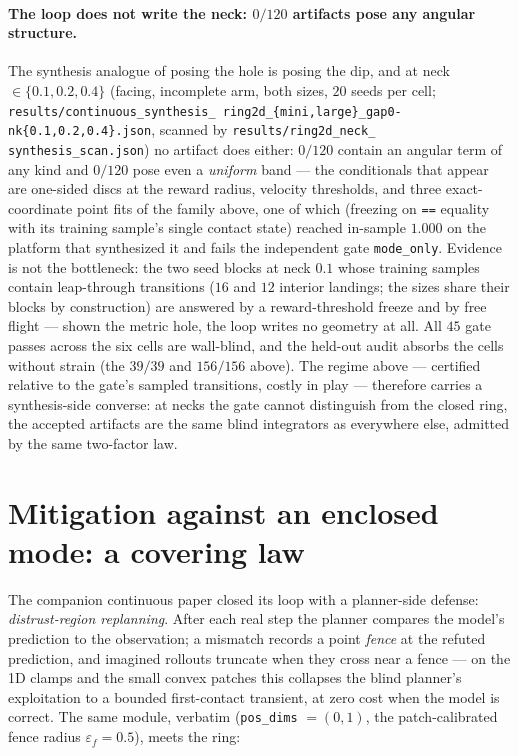\documentclass[11pt]{article}
\theoremstyle{remark}
\begin{document}
\paragraph{The loop does not write the neck: $0/120$ artifacts pose any
angular structure.} The synthesis analogue of posing the hole is posing
the dip, and at neck $\in \{0.1, 0.2, 0.4\}$ (facing, incomplete arm,
both sizes, $20$ seeds per cell;
\texttt{results/continuous\_\allowbreak synthesis\_\allowbreak
ring2d\_\allowbreak \{mini,large\}\_\allowbreak gap0-nk\{0.1,0.2,0.4\}.json},
scanned by \texttt{results/ring2d\_\allowbreak neck\_\allowbreak
synthesis\_\allowbreak scan.json}) no artifact does either: $0/120$
contain an angular term of any kind and $0/120$ pose even a
\emph{uniform} band --- the conditionals that appear are one-sided discs
at the reward radius, velocity thresholds, and three exact-coordinate
point fits of the family above, one of which (freezing on \texttt{==}
equality with its training sample's single contact state) reached
in-sample $1.000$ on the platform that synthesized it and fails the
independent gate \texttt{mode\_only}. Evidence is not the bottleneck:
the two seed blocks at neck $0.1$ whose training samples contain
leap-through transitions ($16$ and $12$ interior landings; the sizes
share their blocks by construction) are answered by a reward-threshold
freeze and by free flight --- shown the metric hole, the loop writes no
geometry at all. All $45$ gate passes across the six cells are
wall-blind, and the held-out audit absorbs the cells without strain
(the $39/39$ and $156/156$ above). The regime above --- certified
relative to the gate's sampled transitions, costly in play --- therefore
carries a synthesis-side converse: at necks the gate cannot distinguish
from the closed ring, the accepted artifacts are the same blind
integrators as everywhere else, admitted by the same two-factor law.

\section{Mitigation against an enclosed mode: a covering law}
\label{sec:mitigation}

The companion continuous paper closed its loop with a planner-side defense:
\emph{distrust-region replanning}. After each real step the planner compares
the model's prediction to the observation; a mismatch records a point
\emph{fence} at the refuted prediction, and imagined rollouts truncate when
they cross near a fence --- on the 1D clamps and the small convex patches
this collapses the blind planner's exploitation to a bounded first-contact
transient, at zero cost when the model is correct. The same module, verbatim
(\texttt{pos\_dims} $=(0,1)$, the patch-calibrated fence radius
$\varepsilon_f = 0.5$), meets the ring:
\end{document}
